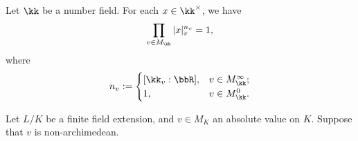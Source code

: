     \begin{proposition}\label{prop:product_formula_for_number_fields}
        Let \(\kk\) be a number field.
        For each \(x \in \kk^\times\), we have
        \[
            \prod_{v \in M_\kk} |x|_v^{n_v} = 1,
        \]
        where
        \[
            n_v := \begin{cases}
                [\kk_v : \bbR], & v \in M_\kk^\infty; \\
                1, & v \in M_\kk^0.
            \end{cases}
        \]
    \end{proposition}

    
    \begin{remark}\label{rmk:about_Einsention_criterion_and_mod_p_criterion}
        Let \(L/K\) be a finite field extension, and \(v \in M_K\) an absolute value on \(K\).
        Suppose that \(v\) is non-archimedean.
    \end{remark}
